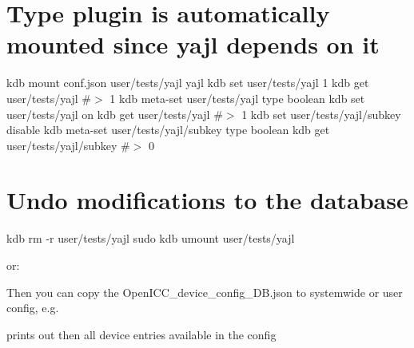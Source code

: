  \hypertarget{autotoc_md726_autotoc_md751}{}\section{Type plugin is automatically mounted since yajl depends on it}\label{autotoc_md726_autotoc_md751}
kdb mount conf.\+json user/tests/yajl yajl kdb set user/tests/yajl 1 kdb get user/tests/yajl \#$>$ 1 kdb meta-\/set user/tests/yajl type boolean kdb set user/tests/yajl on kdb get user/tests/yajl \#$>$ 1 kdb set user/tests/yajl/subkey disable kdb meta-\/set user/tests/yajl/subkey type boolean kdb get user/tests/yajl/subkey \#$>$ 0\hypertarget{autotoc_md726_autotoc_md752}{}\section{Undo modifications to the database}\label{autotoc_md726_autotoc_md752}
kdb rm -\/r user/tests/yajl sudo kdb umount user/tests/yajl 
\begin{DoxyCode}{0}
\DoxyCodeLine{}
\DoxyCodeLine{}
\DoxyCodeLine{}
\end{DoxyCode}


or\+:


\begin{DoxyCode}{0}
\end{DoxyCode}


Then you can copy the {\ttfamily Open\+I\+C\+C\+\_\+device\+\_\+config\+\_\+\+D\+B.\+json} to systemwide or user config, e.\+g.


\begin{DoxyCode}{0}
\DoxyCodeLine{}
\end{DoxyCode}


prints out then all device entries available in the config


\begin{DoxyCode}{0}
\end{DoxyCode}


